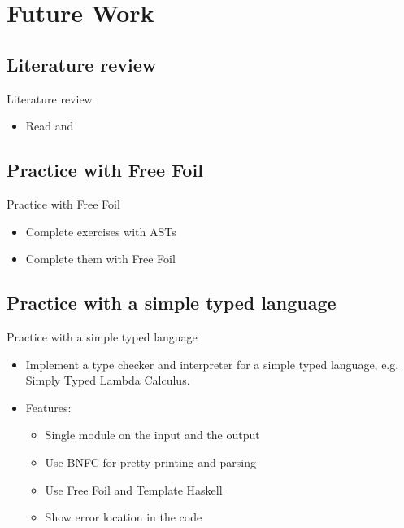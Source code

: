\documentclass[serif, aspectratio=169]{beamer}
\begin{document}
\section{Future Work}

\subsection{Literature review}

\begin{frame}{Literature review}
    \begin{itemize}
        \item Read \cite{maclaurin_foil_2022} and \cite{kudasov_free_2024}
    \end{itemize}
\end{frame}

\subsection{Practice with Free Foil}

\begin{frame}{Practice with Free Foil}
    \begin{itemize}
        \item Complete exercises with ASTs
        \item Complete them with Free Foil
    \end{itemize}
\end{frame}

\subsection{Practice with a simple typed language}

\begin{frame}{Practice with a simple typed language}
    \begin{itemize}
        \item Implement a type checker and interpreter for a simple typed language, e.g. Simply Typed Lambda Calculus.
        \item Features:
              \begin{itemize}
                  \item Single module on the input and the output
                  \item Use BNFC for pretty-printing and parsing
                  \item Use Free Foil and Template Haskell
                  \item Show error location in the code
              \end{itemize}
    \end{itemize}

\end{frame}
\end{document}
